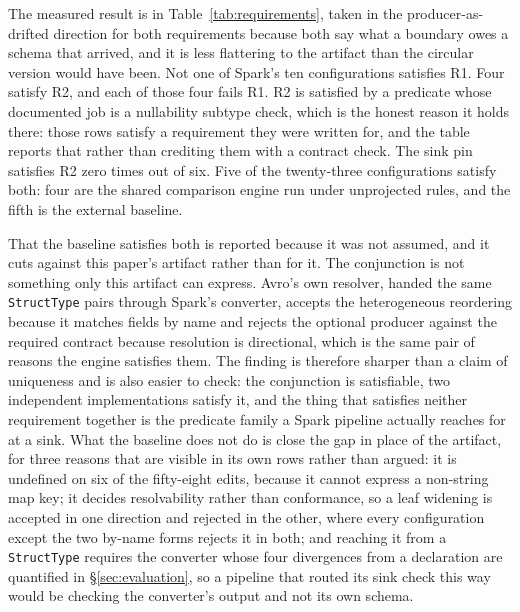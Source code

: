 The measured result is in Table~\ref{tab:requirements}, taken in the producer-as-drifted direction for both requirements because both say what a boundary owes a schema that arrived, and it is less flattering to the artifact than the circular version would have been. Not one of Spark's ten configurations satisfies R1. Four satisfy R2, and each of those four fails R1. R2 is satisfied by a predicate whose documented job is a nullability subtype check, which is the honest reason it holds there: those rows satisfy a requirement they were written for, and the table reports that rather than crediting them with a contract check. The sink pin satisfies R2 zero times out of six. Five of the twenty-three configurations satisfy both: four are the shared comparison engine run under unprojected rules, and the fifth is the external baseline.

That the baseline satisfies both is reported because it was not assumed, and it cuts against this paper's artifact rather than for it. The conjunction is not something only this artifact can express. Avro's own resolver, handed the same \texttt{StructType} pairs through Spark's converter, accepts the heterogeneous reordering because it matches fields by name and rejects the optional producer against the required contract because resolution is directional, which is the same pair of reasons the engine satisfies them. The finding is therefore sharper than a claim of uniqueness and is also easier to check: the conjunction is satisfiable, two independent implementations satisfy it, and the thing that satisfies neither requirement together is the predicate family a Spark pipeline actually reaches for at a sink. What the baseline does not do is close the gap in place of the artifact, for three reasons that are visible in its own rows rather than argued: it is undefined on six of the fifty-eight edits, because it cannot express a non-string map key; it decides resolvability rather than conformance, so a leaf widening is accepted in one direction and rejected in the other, where every configuration except the two by-name forms rejects it in both; and reaching it from a \texttt{StructType} requires the converter whose four divergences from a declaration are quantified in \S\ref{sec:evaluation}, so a pipeline that routed its sink check this way would be checking the converter's output and not its own schema.

